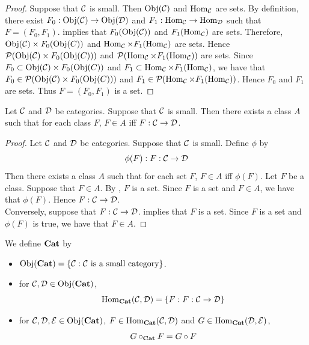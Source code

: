 \documentclass{book}
\begin{document}
	\begin{proof}
		Suppose that $\mathcal{C}$ is small. Then $\operatorname{Obj}(\mathcal{C})$ and $\operatorname{Hom}_{\mathcal{C}}$ are sets. By definition, there exist $F_0: \operatorname{Obj}(\mathcal{C}) \rightarrow \operatorname{Obj}(\mathcal{D})$ and $F_1: \operatorname{Hom}_{\mathcal{C}} \rightarrow \operatorname{Hom}_{\mathcal{D}}$ such that $F = (F_0, F_1)$.  implies that $F_0(\operatorname{Obj}(\mathcal{C}))$ and $F_1(\operatorname{Hom}_{\mathcal{C}})$ are sets. Therefore, $\operatorname{Obj}(\mathcal{C}) \times F_0(\operatorname{Obj}(C))$ and $\operatorname{Hom}_{\mathcal{C}} \times F_1(\operatorname{Hom}_{\mathcal{C}})$ are sets. Hence $\mathcal{P}(\operatorname{Obj}(\mathcal{C}) \times F_0(\operatorname{Obj}(C)))$ and $\mathcal{P}(\operatorname{Hom}_{\mathcal{C}} \times F_1(\operatorname{Hom}_{\mathcal{C}}))$ are sets. Since $F_0 \subset \operatorname{Obj}(\mathcal{C}) \times F_0(\operatorname{Obj}(C))$ and $F_1 \subset \operatorname{Hom}_{\mathcal{C}} \times F_1(\operatorname{Hom}_{\mathcal{C}})$, we have that $F_0 \in \mathcal{P}(\operatorname{Obj}(\mathcal{C}) \times F_0(\operatorname{Obj}(C)))$ and $F_1 \in \mathcal{P}(\operatorname{Hom}_{\mathcal{C}} \times F_1(\operatorname{Hom}_{\mathcal{C}}))$. Hence $F_0$ and $F_1$ are sets. Thus $F = (F_0, F_1)$ is a set. 
	\end{proof}

	\begin{ex} 
		Let $\mathcal{C}$ and $\mathcal{D}$ be categories. Suppose that $\mathcal{C}$ is small. Then there exists a class $A$ such that for each class $F$, $F \in A$ iff $F: \mathcal{C} \rightarrow \mathcal{D}$.   
	\end{ex}
	
	\begin{proof} 
		Let $\mathcal{C}$ and $\mathcal{D}$ be categories. Suppose that $\mathcal{C}$ is small. Define $\phi$ by 
		$$\phi(F) : F : \mathcal{C} \rightarrow \mathcal{D}$$ 
		Then there exists a class $A$ such that for each set $F$, $F \in A$ iff $\phi(F)$. Let $F$ be a class. Suppose that $F \in A$. By , $F$ is a set. Since $F$ is a set and $F \in A$, we have that $\phi(F)$. Hence $F: \mathcal{C} \rightarrow \mathcal{D}$. \\
		Conversely, suppose that $F: \mathcal{C} \rightarrow \mathcal{D}$.  implies that $F$ is a set. Since $F$ is a set and $\phi(F)$ is true, we have that $F \in A$. 
	\end{proof}
	
	\begin{defn} 
		We define $\textbf{Cat}$ by 
		\begin{itemize}
			\item $\operatorname{Obj}(\textbf{Cat}) = \{\mathcal{C}: \mathcal{C} \text{ is a small category}\}$.
			\item for $\mathcal{C},\mathcal{D} \in \operatorname{Obj}(\textbf{Cat})$, 
			$$\operatorname{Hom}_{\textbf{Cat}}(\mathcal{C},\mathcal{D}) = \{F : F: \mathcal{C} \rightarrow \mathcal{D} \}$$
			\item for $\mathcal{C},\mathcal{D}, \mathcal{E} \in \operatorname{Obj}(\textbf{Cat})$, $F \in \operatorname{Hom}_{\textbf{Cat}}(\mathcal{C},\mathcal{D})$ and $G \in \operatorname{Hom}_{\textbf{Cat}}(\mathcal{D}, \mathcal{E})$, $$G \circ_{\textbf{Cat}} F = G \circ F$$
		\end{itemize}
	\end{defn}
\end{document}
